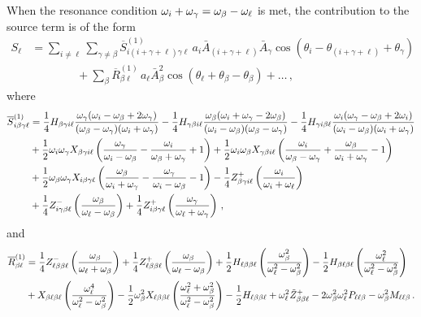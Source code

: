 \documentclass[../PhD.tex]{subfiles}
\newcommand{\obet}{\omega_{\beta}}
\newcommand{\ogam}{\omega_\gamma}
\begin{document}
When the resonance condition $\oi + \ogam = \obet - \ol$ is met, the contribution to the source term is of the form
\begin{align}
\label{intpluschi1 source}
S_\ell &= \sum_{i \neq \ell} \sum_{\gamma \neq \beta} \overline{S}^{(1)}_{i (i + \gamma + \ell) \gamma \ell} \, a_i \bar A_{(i + \gamma + \ell)} \bar A_\gamma \cos \left( \theta_i - \theta_{(i + \gamma + \ell)} + \theta_\gamma \right) \nonumber \\
%
& \qquad \qquad + \sum_\beta \overline{R}^{(1)}_{\beta \ell} \, a_\ell \bar A_\beta^2  \cos \left(\theta_\ell + \theta_\beta - \theta_\beta \right) + \ldots \, ,
\end{align}
where 
\begin{align}
\overline{S}^{(1)}_{i \beta\gamma\ell} &= \frac{1}{4} H_{\beta\gamma i \ell} \frac{ \ogam (\oi - \obet + 2\ogam)}{(\obet - \ogam)(\oi + \ogam)} - \frac{1}{4} H_{\gamma\beta i \ell} \frac{\obet(\oi + \ogam - 2\obet)}{(\oi - \obet)(\obet - \ogam)} - \frac{1}{4} H_{\gamma i \beta\ell} \frac{\oi (\ogam - \obet + 2\oi)}{(\oi - \obet)(\oi + \ogam)} \nonumber \\
%
& + \frac{1}{2} \oi \ogam X_{\beta\gamma i \ell} \left( \frac{\ogam}{\oi - \obet} - \frac{\oi}{\obet + \ogam} + 1 \right) + \frac{1}{2} \oi \obet X_{\gamma\beta i \ell} \left( \frac{\oi}{\obet - \ogam} + \frac{\obet}{\oi + \ogam} - 1 \right) \nonumber \\
%
& + \frac{1}{2} \obet \ogam X_{i\beta\gamma\ell} \left(\frac{\obet}{\oi + \ogam} - \frac{\ogam}{\oi - \obet} - 1 \right) - \frac{1}{4} Z^+_{\beta\gamma i \ell} \left( \frac{\oi}{\oi + \ol}\right)  \nonumber \\
%
& + \frac{1}{4} Z^{-}_{i\gamma\beta\ell} \left(  \frac{\obet}{\ol - \obet}  \right) + \frac{1}{4} Z^+_{i\beta\gamma\ell} \left( \frac{\ogam}{\ol + \ogam} \right) \, ,
\end{align}
and
\begin{align}
\overline{R}^{(1)}_{\beta \ell} &= \frac{1}{4} Z^{-}_{\ell \beta \beta \ell} \left( \frac{\obet}{\ol + \obet} \right) +  \frac{1}{4} Z^+_{\ell \beta \beta \ell} \left(\frac{\obet}{\ol - \obet} \right) + \frac{1}{2} H_{\ell\beta\beta\ell} \left( \frac{\obet^2}{\ol^2 - \obet^2} \right) - \frac{1}{2} H_{\beta \ell\beta\ell} \left( \frac{\ol^2}{\ol^2 - \obet^2} \right) \nonumber \\
%
& + X_{\beta\ell\beta\ell} \left( \frac{\ol^4}{\ol^2 - \obet^2} \right)  - \frac{1}{2} \obet^2  X_{\ell\beta\beta\ell} \left(\frac{\ol^2 + \obet^2 }{\ol^2 - \obet^2} \right)  - \frac{1}{2} H_{\ell\beta\beta\ell} + \ol^2 \tilde{Z}^+_{\beta\beta\ell} -2 \obet^2 \ol^2 P_{\ell\ell\beta} - \obet^2 M_{\ell\ell\beta} \, .
\end{align}
\end{document}
